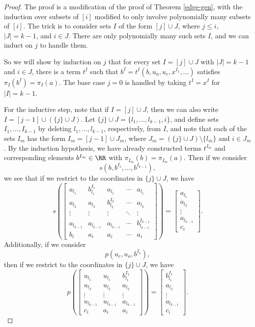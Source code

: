 \begin{proof} The proof is a modification of the proof of Theorem \ref{edge-gen}, with the induction over subsets of $[i]$ modified to only involve polynomially many subsets of $[i]$. The trick is to consider sets $I$ of the form $[j] \cup J$, where $j \le i$, $|J| = k-1$, and $i \in J$. There are only polynomially many such sets $I$, and we can induct on $j$ to handle them.

So we will show by induction on $j$ that for every set $I = [j] \cup J$ with $|J| = k-1$ and $i \in J$, there is a term $t^I$ such that $b^I = t^I(b,u_a,u_c,x^{I_1}, ...)$ satisfies $\pi_I(b^I) = \pi_I(a)$. The base case $j = 0$ is handled by taking $t^I = x^I$ for $|I| = k-1$.

For the inductive step, note that if $I = [j] \cup J$, then we can also write $I = [j-1] \cup (\{j\} \cup J)$. Let $\{j\} \cup J = \{l_1, ..., l_{k-1}, i\}$, and define sets $I_1, ..., I_{k-1}$ by deleting $l_1, ..., l_{k-1}$, respectively, from $I$, and note that each of the sets $I_m$ has the form $I_m = [j-1] \cup J_m$, where $J_m = (\{j\} \cup J)\setminus \{l_m\}$ and $i \in J_m$. By the induction hypothesis, we have already constructed terms $t^{I_m}$ and corresponding elements $b^{I_m} \in \RR$ with $\pi_{I_m}(b) = \pi_{I_m}(a)$. Then if we consider
\[
s(b,b^{I_1}, ..., b^{I_{k-1}}),
\]
we see that if we restrict to the coordinates in $\{j\} \cup J$, we have
\[
s\left(\begin{bmatrix} a_{l_1} & b^{I_1}_{l_1} & a_{l_1} & \cdots & a_{l_1}\\ a_{l_2} & a_{l_2} & b^{I_2}_{l_2} & \cdots & a_{l_2}\\ \vdots & \vdots & \vdots & \ddots & \vdots\\ a_{l_{k-1}} & a_{l_{k-1}} & a_{l_{k-1}} & \cdots & b^{I_{k-1}}_{l_{k-1}}\\ b_i & a_i & a_i & \cdots & a_i\end{bmatrix}\right) = \begin{bmatrix} a_{l_1}\\ a_{l_2}\\ \vdots\\ a_{l_{k-1}}\\ c_i\end{bmatrix}.
\]
Additionally, if we consider
\[
p(u_c,u_a,b^{I_1}),
\]
then if we restrict to the coordinates in $\{j\} \cup J$, we have
\[
p\left(\begin{bmatrix} u_{l_1} & u_{l_1} & b^{I_1}_{l_1}\\ u_{l_2} & u_{l_2} & a_{l_2}\\ \vdots & \vdots & \vdots\\ u_{l_{k-1}} & u_{l_{k-1}} & a_{l_{k-1}}\\ c_i & a_i & a_i\end{bmatrix}\right) = \begin{bmatrix} b^{I_1}_{l_1}\\ a_{l_2}\\ \vdots\\ a_{l_{k-1}}\\ c_i\end{bmatrix}.
\]
\end{proof}
